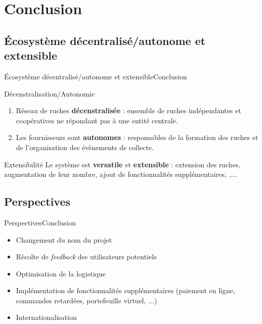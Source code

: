 \documentclass[usenames,dvipsnames]{beamer}
\begin{document}
\section{Conclusion}
\subsection{Écosystème décentralisé/autonome et extensible}
\begin{frame}{Écosystème décentralisé/autonome et extensible}{Conclusion}

\begin{block}{Décenstralisation/Autonomie}
\begin{enumerate}
  \item Réseau de ruches \textbf{décenstralisée} : ensemble de ruches indépendantes et coopératives ne répondant pas à une entité centrale.
  \item Les fournisseurs sont \textbf{autonomes} : responsables de la formation des ruches et de l'organisation des évènements de collecte.
\end{enumerate}
\end{block}

\begin{block}{Extensibilité}
Le système est \textbf{versatile} et \textbf{extensible} : extension des ruches, augmentation de leur nombre, ajout de fonctionnalités supplémentaires, $\dots$.
\end{block}
\end{frame}

\subsection{Perspectives}
\begin{frame}{Perspectives}{Conclusion}
 \begin{itemize}
   \item Changement du nom du projet
   \item Récolte de \textit{feedback} des utilisateurs potentiels
   \item Optimisation de la logistique
   \item Implémentation de fonctionnalités supplémentaires (paiement en ligne, commandes retardées, portefeuille virtuel, $\dots$)
   \item Internationalisation
 \end{itemize}
\end{frame}
\end{document}
